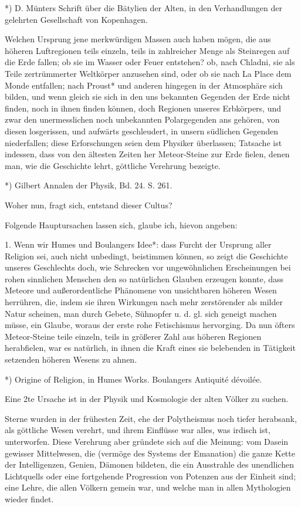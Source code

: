 \documentclass[a4paper, 11pt, oneside, polutonikogreek, german]{article}
\begin{document}
*) D. Münters Schrift über die Bätylien der Alten, in den Verhandlungen der gelehrten Gesellschaft von Kopenhagen.

Welchen Ursprung jene merkwürdigen Massen auch haben mögen, die aus höheren Luftregionen teils einzeln, teils in zahlreicher Menge als Steinregen auf die Erde fallen; ob sie im Wasser oder Feuer entstehen? ob, nach Chladni, sie als Teile zertrümmerter Weltkörper anzusehen sind, oder ob sie nach La Place dem Monde entfallen; nach Proust* und anderen hingegen in der Atmosphäre sich bilden, und wenn gleich sie sich in den uns bekannten Gegenden der Erde nicht finden, noch in ihnen finden können, doch Regionen unseres Erbkörpers, und zwar den unermesslichen noch unbekannten Polargegenden ans gehören, von diesen losgerissen, und aufwärts geschleudert, in unsern südlichen Gegenden niederfallen; diese Erforschungen seien dem Physiker überlassen; Tatsache ist indessen, dass von den ältesten Zeiten her Meteor-Steine zur Erde fielen, denen man, wie die Geschichte lehrt, göttliche Verehrung bezeigte.

*) Gilbert Annalen der Physik, Bd. 24. S. 261.

Woher nun, fragt sich, entstand dieser Cultus?

Folgende Hauptursachen lassen sich, glaube ich, hievon angeben:

1. Wenn wir Humes und Boulangers Idee*: dass Furcht der Ursprung aller Religion sei, auch nicht unbedingt, beistimmen können, so zeigt die Geschichte unseres Geschlechts doch, wie Schrecken vor ungewöhnlichen Erscheinungen bei rohen sinnlichen Menschen den so natürlichen Glauben erzeugen konnte, dass Meteore und außerordentliche Phänomene von unsichtbaren höheren Wesen herrühren, die, indem sie ihren Wirkungen nach mehr zerstörender als milder Natur scheinen, man durch Gebete, Sühnopfer u. d. gl. sich geneigt machen müsse, ein Glaube, woraus der erste rohe Fetischismus hervorging. Da nun öfters Meteor-Steine teile einzeln, teils in größerer Zahl aus höheren Regionen herabfielen, war es natürlich, in ihnen die Kraft eines sie belebenden in Tätigkeit setzenden höheren Wesens zu ahnen.

*) Origine of Religion, in Humes Works. Boulangers Antiquité dévoilée.

Eine 2te Ursache ist in der Physik und Kosmologie der alten Völker zu suchen.

Sterne wurden in der frühesten Zeit, ehe der Polytheismus noch tiefer herabsank, als göttliche Wesen verehrt, und ihrem Einflüsse war alles, was irdisch ist, unterworfen. Diese Verehrung aber gründete sich auf die Meinung: vom Dasein gewisser Mittelwesen, die (vermöge des Systems der Emanation) die ganze Kette der Intelligenzen, Genien, Dämonen bildeten, die ein Ausstrahle des unendlichen Lichtquells oder eine fortgehende Progression von Potenzen aus der Einheit sind; eine Lehre, die allen Völkern gemein war, und welche man in allen Mythologien wieder findet.
\end{document}
